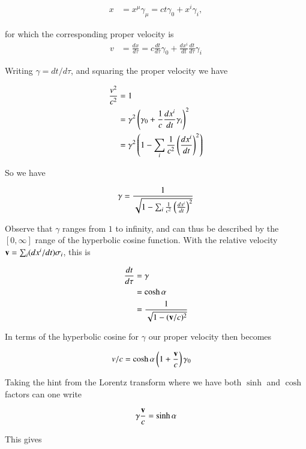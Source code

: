 \begin{align*}
x &= x^\mu \gamma_\mu = ct \gamma_0 + x^i \gamma_i,
\end{align*}

for which the corresponding proper velocity is
\begin{align*}
v &= \frac{dx}{d\tau} = c \frac{dt}{d\tau} \gamma_0 + \frac{dx^i}{dt} \frac{dt}{d\tau} \gamma_i
\end{align*}

Writing $\gamma = dt/d\tau$, and squaring the proper velocity we have

\begin{align*}
\frac{v^2}{c^2}
&= 1 \\
&= \gamma^2 \left(\gamma_0 + \frac{1}{c}\frac{dx^i}{dt} \gamma_i\right)^2 \\
&= \gamma^2 \left(1 - \sum_i \frac{1}{c^2} \left(\frac{dx^i}{dt}\right)^2 \right) \\
\end{align*}

So we have 

\begin{align*}
\gamma 
&= \frac{1}{\sqrt{1 - \sum_i \frac{1}{c^2} \left(\frac{dx^i}{dt}\right)^2 }} \\
\end{align*}

Observe that $\gamma$ ranges from $1$ to infinity, and can thus be described by the $[0,\infty]$ range of the hyperbolic cosine function.  With
the relative velocity $\mathbf{v} = \sum_i (dx^i/dt) \sigma_i$, this is

\begin{align*}
\frac{dt}{d\tau} &= \gamma  \\
&= \cosh\alpha \\
&= \frac{1}{\sqrt{1 - (\mathbf{v}/c)^2}}
\end{align*}

In terms of the hyperbolic cosine for $\gamma$ our proper velocity then becomes

\begin{align*}
v/c &= \cosh\alpha \left(1 + \frac{\mathbf{v}}{c} \right) \gamma_0
\end{align*}

Taking the hint from the Lorentz transform where we have both $\sinh$ and $\cosh$ factors can one write

\begin{align*}
\gamma \frac{\mathbf{v}}{c} = \sinh\alpha
\end{align*}

This gives

